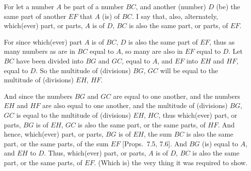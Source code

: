 \begin{Parallel}{}{}
{\epsfysize=2in
\centerline{}

For let a number $A$ be part of a number $BC$, and another (number) $D$ (be) the same
part of another $EF$ that $A$ (is) of $BC$. I say that, also, alternately, which(ever) part, or
parts, $A$ is of $D$, $BC$ is also the same part, or parts, of $EF$.

For since which(ever) part $A$ is of $BC$, $D$ is also the same part of $EF$, thus
as many numbers as are in $BC$ equal to $A$, so many are also in $EF$ equal to
$D$. Let $BC$ have been divided into $BG$ and $GC$, equal to $A$, and $EF$ into
$EH$ and $HF$, equal to $D$. So the multitude of (divisions) $BG$, $GC$ will be
equal to the multitude of (divisions) $EH$, $HF$.

And since the numbers $BG$ and $GC$ are equal to one another, and
the numbers $EH$ and $HF$ are also equal to one another, and the
multitude of (divisions) $BG$, $GC$ is equal to the multitude of (divisions)
$EH$, $HC$, thus which(ever) part, or parts, $BG$ is of $EH$, $GC$ is also
the same part, or the same parts, of $HF$. And hence, which(ever)
part, or parts, $BG$ is of $EH$, the sum $BC$ is also the same
part, or the same parts, of the sum $EF$ [Props.~7.5, 7.6]. And $BG$ (is) equal to $A$, and $EH$ to $D$.
 Thus, which(ever) part, or parts, $A$ is of $D$, $BC$ is also the same part, or
 the same parts, of $EF$. (Which is) the very thing it was required to show.}
\end{Parallel}


\vspace{7pt}{\footnotesize\noindent$^\dag$ In modern notation, this
proposition states that if $a=(1/n)\,b$ and $c=(1/n)\,d$ then if $a=(k/l)\,c$
then $b = (k/l)\,d$, where all symbols denote numbers.}

